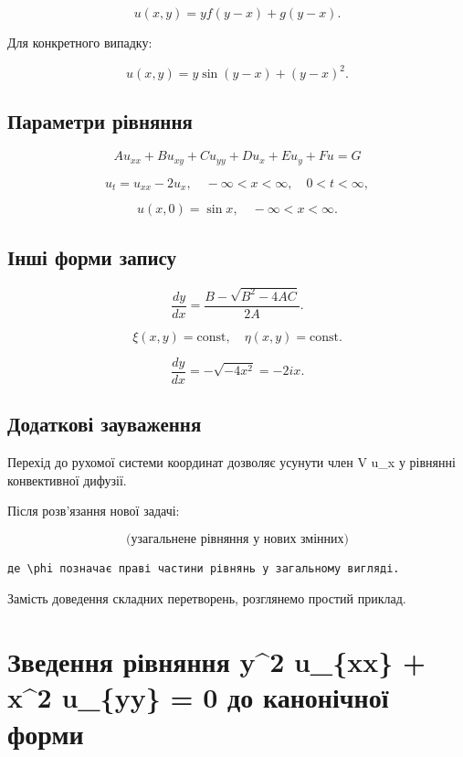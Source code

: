 \documentclass[
  ukrainian,
]{article}
\begin{document}
\[
u(x, y) = y f(y - x) + g(y - x).
\]

Для конкретного випадку:

\[
u(x, y) = y \sin(y - x) + (y - x)^2.
\]

\subsection{Параметри
рівняння}\label{ux43fux430ux440ux430ux43cux435ux442ux440ux438-ux440ux456ux432ux43dux44fux43dux43dux44f}

\[
A u_{xx} + B u_{xy} + C u_{yy} + D u_x + E u_y + F u = G
\]

\[
u_t = u_{xx} - 2u_x, \quad -\infty < x < \infty, \quad 0 < t < \infty,
\]

\[
u(x, 0) = \sin x, \quad -\infty < x < \infty.
\]

\subsection{Інші форми
запису}\label{ux456ux43dux448ux456-ux444ux43eux440ux43cux438-ux437ux430ux43fux438ux441ux443}

\[
\frac{dy}{dx} = \frac{B - \sqrt{B^2 - 4AC}}{2A}.
\]

\[
\xi(x, y) = \text{const}, \quad \eta(x, y) = \text{const}.
\]

\[
\frac{dy}{dx} = -\sqrt{-4x^2} = -2ix.
\]

\subsection{Додаткові
зауваження}\label{ux434ux43eux434ux430ux442ux43aux43eux432ux456-ux437ux430ux443ux432ux430ux436ux435ux43dux43dux44f}

Перехід до рухомої системи координат дозволяє усунути член V u\_x у
рівнянні конвективної дифузії.

Після розв'язання нової задачі:

\[
\text{(узагальнене рівняння у нових змінних)}
\]

\begin{verbatim}
де \phi позначає праві частини рівнянь у загальному вигляді.
\end{verbatim}

Замість доведення складних перетворень, розглянемо простий приклад.

\section{Зведення рівняння y\^{}2 u\_\{xx\} + x\^{}2 u\_\{yy\} = 0 до
канонічної
форми}\label{ux437ux432ux435ux434ux435ux43dux43dux44f-ux440ux456ux432ux43dux44fux43dux43dux44f-y2-u_xx-x2-u_yy-0-ux434ux43e-ux43aux430ux43dux43eux43dux456ux447ux43dux43eux457-ux444ux43eux440ux43cux438}
\end{document}
